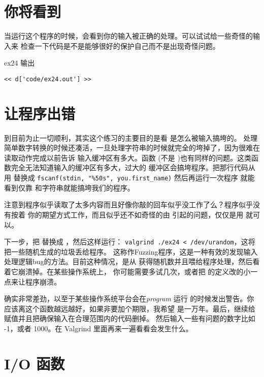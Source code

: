 \section{你将看到}

当运行这个程序的时候，会看到你的输入被正确的处理。可以试试给一些奇怪的输入来
检查一下代码是不是能够很好的保护自己而不是出现奇怪问题。

\begin{code}{ex24 输出}
\begin{lstlisting}
<< d['code/ex24.out'] >>
\end{lstlisting}
\end{code}


\section{让程序出错}

到目前为止一切顺利，其实这个练习的主要目的是看  是怎么被输入搞垮的。
处理简单数字转换的时候还凑活，一旦处理字符串的时候就完全的垮掉了，因为很难在
读取动作完成以前告诉  输入缓冲区有多大。函数 (不是 
)也有同样的问题。这类函数完全无法知道输入的缓冲区有多大，过大的
缓冲区会搞垮程序。把那行代码从用  替换成 
\verb|fscanf(stdin, "%50s", you.first_name)| 然后再运行一次程序
就能看到仅靠  和字符串就能搞垮我们的程序。

注意到程序似乎读取了太多内容而且好像你敲的回车似乎没工作了么？程序似乎没有按着
你的期望方式工作，而且似乎还不如奇怪的由  引起的问题，仅仅是用 
 就可以。

下一步，把 替换成 ，然后这样运行：
\verb|valgrind ./ex24 < /dev/urandom|，这将把一些随机生成的垃圾丢给程序。
这称作Fuzzing程序，这是一种有效的发现输入处理逻辑bug的方法。目前这种情况，是从 
获得随机数并且喂给程序处理，然后看着它崩溃掉。在某些操作系统上，
你可能需要多试几次，或者把 的定义改的小一点来让程序崩溃。

 确实非常差劲，以至于某些操作系统平台会在\emph{program} 运行 
 的时候发出警告。你应该离这个函数越远越好，如果非要加个期限，我希望
是一万年。最后，继续给  赋值并且把确保输入在合理范围内的代码删掉。
然后输入一些有问题的数字比如 -1，或者 1000。在 Valgrind 里面再来一遍看看会发生什么。

\section{I/O 函数}

